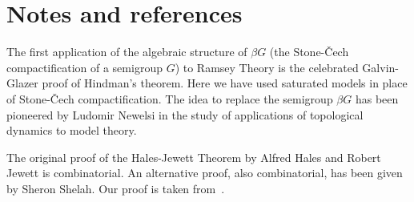 \documentclass[creche.tex]{subfiles}
\begin{document}
\section{Notes and references}

The first application of the algebraic structure of $\beta G$ 
(the Stone-\v{C}ech compactification of a semigroup $G$) 
to Ramsey Theory is the celebrated Galvin-Glazer proof of Hindman's theorem. 
Here we have used saturated models in place of Stone-\v{C}ech compactification.
The idea to replace the semigroup $\beta G$  has been pioneered by Ludomir Newelsi
in the study of applications of topological dynamics to model theory. 

The original proof of the Hales-Jewett Theorem by Alfred Hales and Robert Jewett is combinatorial.
An alternative proof, also combinatorial, has been given by Sheron Shelah.
Our proof is taken from~\cite{CZ}.
\end{document}
